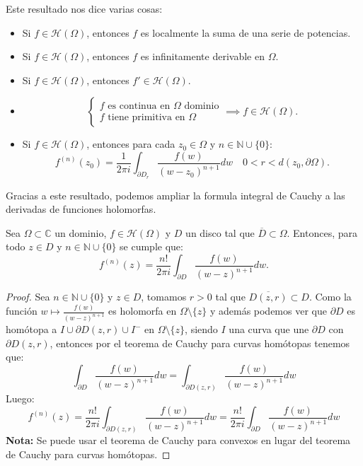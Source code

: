 Este resultado nos dice varias cosas:
\begin{itemize}
    \item Si $f \in \mathcal{H}(\Omega)$, entonces $f$ es localmente la suma de una serie de potencias.
    \item Si $f \in \mathcal{H}(\Omega)$, entonces $f$ es infinitamente derivable en $\Omega$.
    \item Si $f \in \mathcal{H}(\Omega)$, entonces $f' \in \mathcal{H}(\Omega)$.
    \item 
    \[
    \begin{cases}
        f \text{ es continua en } \Omega \text{ dominio}\\
        f \text{ tiene primitiva en } \Omega
    \end{cases}    
    \implies f \in \mathcal{H}(\Omega).
    \]
    \item Si $f \in \mathcal{H}(\Omega)$, entonces para cada $z_0 \in \Omega$ y $n \in \mathbb{N} \cup \{0\}$:
    \[
    f^{(n)}(z_0) = \frac{1}{2 \pi i} \int_{\partial D_r} \frac{f(w)}{(w - z_0)^{n+1}} dw \quad 0 < r < d(z_0, \partial \Omega).
    \]
\end{itemize}

Gracias a este resultado, podemos ampliar la formula integral de Cauchy a las derivadas de funciones holomorfas.

\begin{teorema}
    Sea $\Omega \subset \mathbb{C}$ un dominio, $f \in \mathcal{H}(\Omega)$ y $D$ un disco tal que $\overline{D} \subset \Omega$. Entonces, para todo $z \in D$ y $n \in \mathbb{N} \cup \{0\}$ se cumple que:
    \[
    f^{(n)}(z) = \frac{n!}{2 \pi i} \int_{\partial D} \frac{f(w)}{(w - z)^{n+1}} dw.
    \]
\end{teorema}

\begin{proof}
    Sea $n \in \mathbb{N} \cup \{0\}$ y $z \in D$, tomamos $r > 0$ tal que $\overline{D(z, r)} \subset D$. Como la función $w \mapsto \frac{f(w)}{(w - z)^{n+1}}$ es holomorfa en $\Omega \setminus \{ z \}$ y además podemos ver que $\partial D$ es homótopa a $I \cup \partial D(z, r) \cup I^{-}$ en $\Omega \setminus \{ z \}$, siendo $I$ una curva que une $\partial D$ con $\partial D(z, r)$, entonces por el teorema de Cauchy para curvas homótopas tenemos que:
    \[
        \int_{\partial D} \frac{f(w)}{(w - z)^{n+1}} dw = 
        \int_{\partial D(z, r)} \frac{f(w)}{(w - z)^{n+1}} dw
    \]
    Luego:
    \[
    f^{(n)}(z) =
    \frac{n!}{2 \pi i} \int_{\partial D(z, r)} \frac{f(w)}{(w - z)^{n+1}} dw =
    \frac{n!}{2 \pi i} \int_{\partial D} \frac{f(w)}{(w - z)^{n+1}} dw
    \]
    \textbf{Nota: } Se puede usar el teorema de Cauchy para convexos en lugar del teorema de Cauchy para curvas homótopas.
\end{proof}

